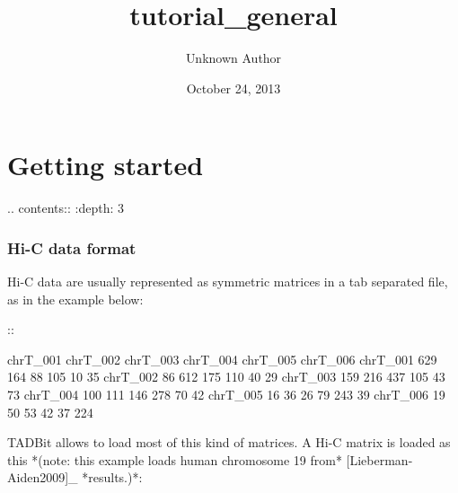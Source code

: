 \documentclass[letterpaper,10pt,english]{/usr/local/lib/python2.7/dist-packages/Sphinx-1.2b1-py2.7.egg/sphinx/texinputs/sphinxhowto}
\title{tutorial\_general}
\date{October 24, 2013}
\author{Unknown Author}
\begin{document}
        
            \maketitle
        

        


        \part{Getting started}
    .. contents::
     :depth: 3
\section{Hi-C data format}
    Hi-C data are usually represented as symmetric matrices in a tab
separated file, as in the example below:

    ::

  chrT_001      chrT_002        chrT_003        chrT_004
chrT_005        chrT_006
  chrT_001      629     164     88      105     10      35
  chrT_002      86      612     175     110     40      29
  chrT_003      159     216     437     105     43      73
  chrT_004      100     111     146     278     70      42
  chrT_005      16      36      26      79      243     39
  chrT_006      19      50      53      42      37      224

    TADBit allows to load most of this kind of matrices. A Hi-C matrix is
loaded as this
*(note: this example loads human chromosome 19 from* [Lieberman-
Aiden2009]_ *results.)*:



\end{document}
